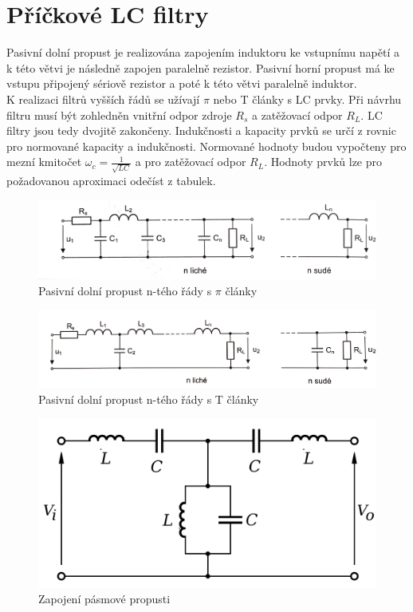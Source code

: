 \documentclass[twoside]{article}
\begin{document}
\section{Příčkové LC filtry}
Pasivní dolní propust je realizována zapojením induktoru ke vstupnímu napětí a k této větvi je následně zapojen paralelně rezistor. Pasivní horní propust má ke vstupu připojený sériově rezistor a poté k této větvi paralelně induktor. \\
K realizaci filtrů vyšších řádů se užívají $\pi$ nebo T články s LC prvky. Při návrhu filtru musí být zohledněn vnitřní odpor zdroje $R_s$ a zatěžovací odpor $R_L$. LC filtry jsou tedy dvojitě zakončeny. Indukčnosti a kapacity prvků se určí z rovnic pro normované kapacity a indukčnosti. Normované hodnoty budou vypočteny pro mezní kmitočet $\omega _c = \frac{1}{\sqrt{LC}}$ a pro zatěžovací odpor $R_L$. Hodnoty prvků lze pro požadovanou aproximaci odečíst z tabulek. \\
\begin{figure}[H]
\centering
\includegraphics[scale=0.1]{piclanky.png}
\caption{Pasivní dolní propust n-tého řády s $\pi$ články \cite{10}}
\end{figure}
\begin{figure}[H]
\centering
\includegraphics[scale=0.08]{tclanky.png}
\caption{Pasivní dolní propust n-tého řády s T články \cite{10}}
\end{figure}
\begin{figure}[H]
\centering
\includegraphics[scale=0.1]{Bandpass_Filter.png}
\caption{Zapojení pásmové propusti \cite{11}}
\end{figure}
\newpage
\end{document}
